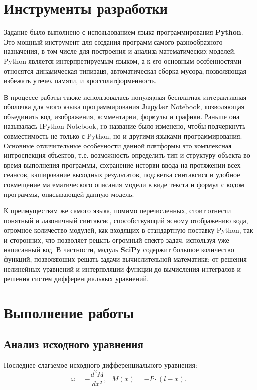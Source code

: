 \section{Инструменты разработки}

Задание было выполнено с использованием языка программирования \textbf{Python}. Это мощный инструмент для создания программ самого разнообразного назначения, в том числе для построения и анализа математических моделей. Python является интерпретируемым языком, а к его основным особенностями относятся динамическая типизаця, автоматическая сборка мусора, позволяющая избежать утечек памяти, и кроссплатформенность. 

В процессе работы также использовалась популярная бесплатная интерактивная оболочка для этого языка программирования \textbf{Jupyter} Notebook, позволяющая объединить код, изображения, комментарии, формулы и графики. Раньше она называлась IPython Notebook, но название было изменено, чтобы подчеркнуть совместимость не только с Python, но и другими языками программирования. Основные отличительные особенности данной платформы  это комплексная интроспекция объектов, т.е. возможность определить тип и структуру объекта во время выполнения программы, сохранение истории ввода на протяжении всех сеансов, кэширование выходных результатов, подсветка синтаксиса и удобное совмещение математического описания модели в виде текста и формул с кодом программы, описывающей данную модель. 

К преимуществам же самого языка, помимо перечисленных, стоит отнести понятный и лаконичный синтаксис, способствующий ясному отображению кода, огромное количество модулей, как входящих в стандартную поставку Python, так и сторонних, что позволяет решать огромный спектр задач, используя уже написанный код. В частности, модуль \textbf{SciPy} содержит большое количество функций, позволяюших решать задачи вычислительной математики: от решения нелинейных уравнений и интерполяции функции до вычисления интегралов и решения систем дифференциальных уравнений.

\section{Выполнение работы}

\subsection{Анализ исходного уравнения}

Последнее слагаемое исходного дифференциального уравнения:
\[
	\omega = -\frac{d^2M}{dx^2},\ \ \ M(x) = -P \cdot (l - x).
\]

